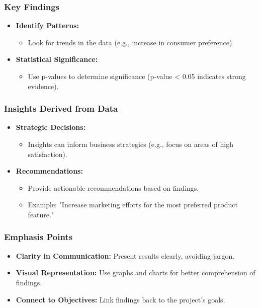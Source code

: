 \documentclass[aspectratio=169]{beamer}
\begin{document}
\begin{frame}
    \frametitle{Key Findings}
    \begin{itemize}
        \item \textbf{Identify Patterns:}
        \begin{itemize}
            \item Look for trends in the data (e.g., increase in consumer preference).
        \end{itemize}

        \item \textbf{Statistical Significance:}
        \begin{itemize}
            \item Use p-values to determine significance (p-value < 0.05 indicates strong evidence).
        \end{itemize}
    \end{itemize}
\end{frame}

\begin{frame}
    \frametitle{Insights Derived from Data}
    \begin{itemize}
        \item \textbf{Strategic Decisions:}
        \begin{itemize}
            \item Insights can inform business strategies (e.g., focus on areas of high satisfaction).
        \end{itemize}

        \item \textbf{Recommendations:}
        \begin{itemize}
            \item Provide actionable recommendations based on findings.
            \item Example: "Increase marketing efforts for the most preferred product feature."
        \end{itemize}
    \end{itemize}
\end{frame}

\begin{frame}
    \frametitle{Emphasis Points}
    \begin{itemize}
        \item \textbf{Clarity in Communication:} Present results clearly, avoiding jargon.
        \item \textbf{Visual Representation:} Use graphs and charts for better comprehension of findings.
        \item \textbf{Connect to Objectives:} Link findings back to the project's goals.
    \end{itemize}
\end{frame}
\end{document}
